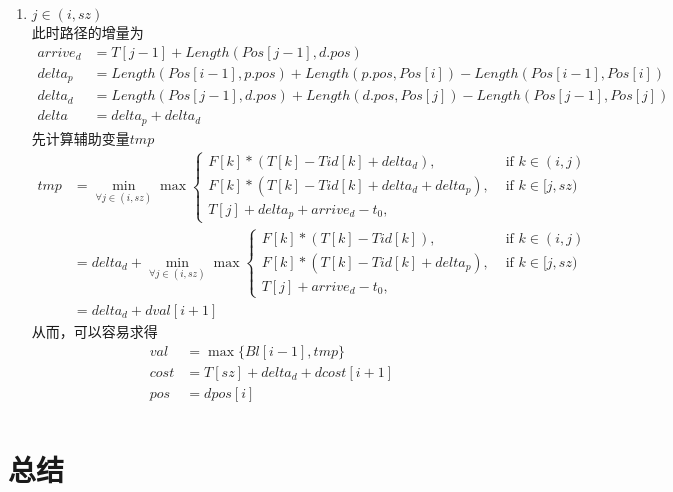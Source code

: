 \documentclass[hyperref,UTF8]{ctexart}
\theoremstyle{definition}
\theoremstyle{remark}
\numberwithin{equation}{subsection}
\begin{document}
\begin{enumerate}[(1)]
	\item $j \in (i, sz)$ \\
	此时路径的增量为
	\begin{align*}
        arrive_d &= T[j-1] + Length(Pos[j-1], d.pos) \\
		delta_p &= Length(Pos[i-1], p.pos) + Length(p.pos, Pos[i]) - Length(Pos[i-1], Pos[i]) \\
		delta_d &= Length(Pos[j-1], d.pos) + Length(d.pos, Pos[j]) - Length(Pos[j-1], Pos[j]) \\
		delta   &= delta_p + delta_d
	\end{align*}
	先计算辅助变量$tmp$
	\begin{align*}
		tmp &= \min_{\forall j\in(i,sz)}
			\max \left\{
				\begin{aligned}
					F[k]*(T[k]-Tid[k]+delta_d), 		&\text{ if } k \in (i,j) \\
					F[k]*(T[k]-Tid[k]+delta_d+delta_p), &\text{ if } k \in [j,sz) \\
					T[j]+delta_p+arrive_d-t_0, 		&\text{ }
				\end{aligned}
			\right . 	\\
			&= delta_d + \min_{\forall j\in(i,sz)}
			\max \left\{
				\begin{aligned}
					F[k]*(T[k]-Tid[k]), 		&\text{ if } k \in (i,j) \\
					F[k]*(T[k]-Tid[k]+delta_p), &\text{ if } k \in [j,sz) \\
					T[j]+arrive_d-t_0, 		&\text{ }
				\end{aligned}
			\right . 	\\
			&= delta_d + dval[i+1]
	\end{align*}
	从而，可以容易求得
	\begin{align*}
		val &= \max\{Bl[i-1], tmp\} \\
		cost &= T[sz] + delta_d + dcost[i+1] \\
		pos &= dpos[i] \\
	\end{align*}

	
\end{enumerate}

\newpage
\section{总结}
	
	
\end{document}
